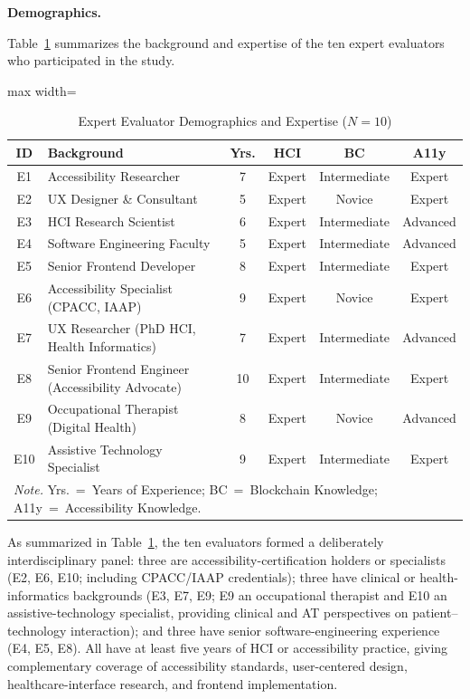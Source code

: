 \documentclass[journal,onecolumn]{IEEEtran}
\begin{document}
\noindent\textbf{Demographics.}

Table~\ref{tab:participants} summarizes the background and expertise of
the ten expert evaluators who participated in the study.

\begin{table}[htbp]
\centering
\caption{Expert Evaluator Demographics and Expertise ($N=10$)}
\label{tab:participants}
\small
\begin{adjustbox}{max width=\columnwidth}
\begin{tabular}{|c|p{2.4cm}|c|c|c|c|}
\hline
\textbf{ID} & \textbf{Background} & \textbf{Yrs.} & \textbf{HCI} & \textbf{BC} & \textbf{A11y} \\
\hline
E1 & Accessibility Researcher & 7 & Expert & Intermediate & Expert \\
\hline
E2 & UX Designer \& Consultant & 5 & Expert & Novice & Expert \\
\hline
E3 & HCI Research Scientist & 6 & Expert & Intermediate & Advanced \\
\hline
E4 & Software Engineering Faculty & 5 & Expert & Intermediate & Advanced \\
\hline
E5 & Senior Frontend Developer & 8 & Expert & Intermediate & Expert \\
\hline
E6 & Accessibility Specialist (CPACC, IAAP) & 9 & Expert & Novice & Expert \\
\hline
E7 & UX Researcher (PhD HCI, Health Informatics) & 7 & Expert & Intermediate & Advanced \\
\hline
E8 & Senior Frontend Engineer (Accessibility Advocate) & 10 & Expert & Intermediate & Expert \\
\hline
E9 & Occupational Therapist (Digital Health) & 8 & Expert & Novice & Advanced \\
\hline
E10 & Assistive Technology Specialist & 9 & Expert & Intermediate & Expert \\
\hline
\multicolumn{6}{l}{\footnotesize\textit{Note.} Yrs.~=~Years of Experience;
BC~=~Blockchain Knowledge; A11y~=~Accessibility Knowledge.}
\end{tabular}
\end{adjustbox}
\end{table}

As summarized in Table~\ref{tab:participants}, the ten evaluators formed a deliberately interdisciplinary panel: three are accessibility-certification holders or specialists (E2, E6, E10; including CPACC/IAAP credentials); three have clinical or health-informatics backgrounds (E3, E7, E9; E9 an occupational therapist and E10 an assistive-technology specialist, providing clinical and AT perspectives on patient--technology interaction); and three have senior software-engineering experience (E4, E5, E8). All have at least five years of HCI or accessibility practice, giving complementary coverage of accessibility standards, user-centered design, healthcare-interface research, and frontend implementation.
\end{document}
